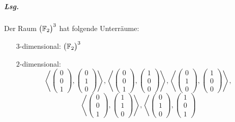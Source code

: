 \documentclass{scrreprt}
\begin{document}
\begin{enumerate}[(a)]
  \subparagraph{Lsg.} Der Raum $\qty\big(\mathbb{F}_2)^3$ hat folgende
  Unterräume:
  \begin{itemize}
  \item[$3$-dimensional:] $\qty\big(\mathbb{F}_2)^3$
  \item[$2$-dimensional:]
    \[
      \left\langle
        \begin{pmatrix} 0 \\ 0 \\ 1 \end{pmatrix},
        \begin{pmatrix} 0 \\ 1 \\ 0 \end{pmatrix}
      \right\rangle,
      \left\langle
        \begin{pmatrix} 0 \\ 0 \\ 1 \end{pmatrix},
        \begin{pmatrix} 1 \\ 0 \\ 0 \end{pmatrix}
      \right\rangle,
      \left\langle
        \begin{pmatrix} 0 \\ 1 \\ 0 \end{pmatrix},
        \begin{pmatrix} 1 \\ 0 \\ 0 \end{pmatrix}
      \right\rangle,
    \]
    \[
      \left\langle
        \begin{pmatrix} 0 \\ 0 \\ 1 \end{pmatrix},
        \begin{pmatrix} 1 \\ 1 \\ 0 \end{pmatrix}
      \right\rangle,
      \left\langle
        \begin{pmatrix} 0 \\ 1 \\ 0 \end{pmatrix},
        \begin{pmatrix} 1 \\ 0 \\ 1 \end{pmatrix}
\]
\end{itemize}
\end{enumerate}
\end{document}
